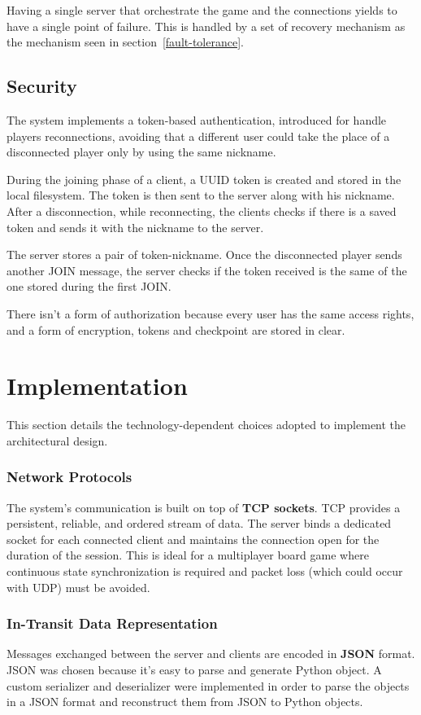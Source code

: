 \documentclass{scrartcl}
\begin{document}
Having a single server that orchestrate the game and the connections yields to have a single point of failure.
This is handled by a set of recovery mechanism as the mechanism seen in section~\ref{fault-tolerance}.


\subsection{Security}\label{security}

The system implements a token-based authentication, introduced for handle players reconnections,
avoiding that a different user could take the place of a disconnected player only by using the same nickname.


During the joining phase of a client, a UUID token is created and stored in the local filesystem.
The token is then sent to the server along with his nickname.
After a disconnection, while reconnecting, the clients checks if there is a saved token and sends it with the nickname to the server.


The server stores a pair of token-nickname.
Once the disconnected player sends another JOIN message, the server checks if the token received is the same of the one stored during
the first JOIN.


There isn't a form of authorization because every user has the same access rights,
and a form of encryption, tokens and checkpoint are stored in clear.


\section{Implementation}\label{implementation}

This section details the technology-dependent choices adopted to implement the architectural design.

\subsubsection*{Network Protocols}
The system's communication is built on top of \textbf{TCP sockets}.
TCP provides a persistent, reliable, and ordered stream of data.
The server binds a dedicated socket for each connected client and maintains the connection open for the duration of the session.
This is ideal for a multiplayer board game where continuous state synchronization is required and packet loss (which could occur with UDP) must be avoided.

\subsubsection*{In-Transit Data Representation}
Messages exchanged between the server and clients are encoded in \textbf{JSON} format.
JSON was chosen because it's easy to parse and generate Python object.
A custom serializer and deserializer were implemented in order to parse the objects in a JSON format and reconstruct them from JSON to Python objects.
\end{document}
